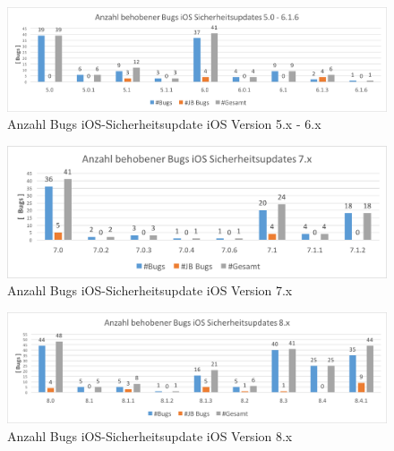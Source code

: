 \begin{figure}[htbp!]
        \centering
                \includegraphics[scale=0.5]{Bilder/iOSSicherheitsupdate5.png}
        \caption{Anzahl Bugs iOS-Sicherheitsupdate iOS Version 5.x - 6.x  \protect\footnotemark}
        \label{fig:AnalyseiOSSicherheitsupdate5}
\end{figure}

\begin{figure}[htbp!]
        \centering
                \includegraphics[scale=0.7]{Bilder/iOSSicherheitsupdate7.png}
        \caption{Anzahl Bugs iOS-Sicherheitsupdate iOS Version 7.x \protect\footnotemark}
        \label{fig:AnalyseiOSSicherheitsupdate7}
\end{figure}

\begin{figure}[htbp!]
        \centering
                \includegraphics[scale=0.5]{Bilder/iOSSicherheitsupdate8.png}
        \caption{Anzahl Bugs iOS-Sicherheitsupdate iOS Version 8.x \protect\footnotemark}
        \label{fig:AnalyseiOSSicherheitsupdate8}
\end{figure}

